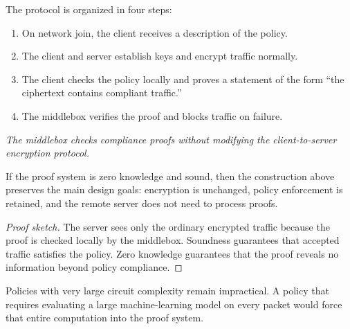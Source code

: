 \documentclass[11pt]{article}
\begin{document}
The protocol is organized in four steps:
\begin{enumerate}
  \item On network join, the client receives a description of the policy.
  \item The client and server establish keys and encrypt traffic normally.
  \item The client checks the policy locally and proves a statement of the form
        ``the ciphertext contains compliant traffic.''
  \item The middlebox verifies the proof and blocks traffic on failure.
\end{enumerate}

\begin{center}

\smallskip
\emph{The middlebox checks compliance proofs without modifying the client-to-server
encryption protocol.}
\end{center}

\begin{proposition}
If the proof system is zero knowledge and sound, then the construction above
preserves the main design goals: encryption is unchanged, policy enforcement is
retained, and the remote server does not need to process proofs.
\end{proposition}

\begin{proof}[Proof sketch]
The server sees only the ordinary encrypted traffic because the proof is
checked locally by the middlebox.  Soundness guarantees that accepted traffic
satisfies the policy.  Zero knowledge guarantees that the proof reveals no
information beyond policy compliance.
\end{proof}

\begin{remark}
Policies with very large circuit complexity remain impractical.  A policy that
requires evaluating a large machine-learning model on every packet would force
that entire computation into the proof system.
\end{remark}
\end{document}
